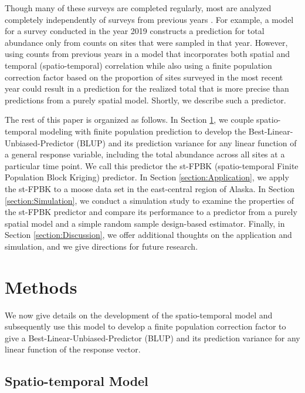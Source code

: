 \documentclass[]{interact}
\theoremstyle{plain}%
\theoremstyle{definition}
\theoremstyle{remark}
\begin{document}
Though many of these surveys are completed regularly, most are analyzed
completely independently of surveys from previous years
\citep[e.g.][]{gasaway1986estimating, kellie_geospatial_2006, boertje2009managing, peters2014contrasting}.
For example, a model for a survey conducted in the year 2019 constructs
a prediction for total abundance only from counts on sites that were
sampled in that year. However, using counts from previous years in a
model that incorporates both spatial and temporal (spatio-temporal)
correlation while also using a finite population correction factor based
on the proportion of sites surveyed in the most recent year could result
in a prediction for the realized total that is more precise than
predictions from a purely spatial model. Shortly, we describe such a
predictor.

The rest of this paper is organized as follows. In Section
\ref{section:Methods}, we couple spatio-temporal modeling with finite
population prediction to develop the Best-Linear-Unbiased-Predictor
(BLUP) and its prediction variance for any linear function of a general
response variable, including the total abundance across all sites at a
particular time point. We call this predictor the st-FPBK
(spatio-temporal Finite Population Block Kriging) predictor. In Section
\ref{section:Application}, we apply the st-FPBK to a moose data set in
the east-central region of Alaska. In Section \ref{section:Simulation},
we conduct a simulation study to examine the properties of the st-FPBK
predictor and compare its performance to a predictor from a purely
spatial model and a simple random sample design-based estimator.
Finally, in Section \ref{section:Discussion}, we offer additional
thoughts on the application and simulation, and we give directions for
future research.

\section{Methods} \label{section:Methods}

We now give details on the development of the spatio-temporal model and
subsequently use this model to develop a finite population correction
factor to give a Best-Linear-Unbiased-Predictor (BLUP) and its
prediction variance for any linear function of the response vector.

\subsection{Spatio-temporal Model}
\end{document}
